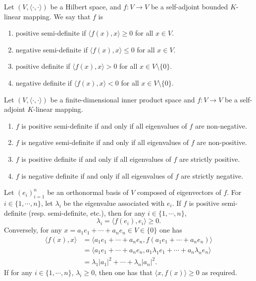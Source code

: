 \begin{definitionenv}
    Let $\left(V,\langle\cdot,\cdot\rangle\right)$ be a Hilbert space, and $f:V\rightarrow V$ be a self-adjoint bounded $K$-linear mapping.
    We say that $f$ is 
    \begin{enumerate}[label=\roman*]
        \item positive semi-definite if $\langle f(x),x\rangle \ge 0$ for all $x\in V$.
        \item negative semi-definite if $\langle f(x),x\rangle \le 0$ for all $x\in V$.
        \item positive definite if $\langle f(x),x\rangle > 0$ for all $x\in V\setminus \{0\}$.
        \item negative definite if $\langle f(x),x\rangle < 0$ for all $x\in V\setminus \{0\}$.
    \end{enumerate}
\end{definitionenv}

\begin{propositionenv}
    Let $(V,\langle\cdot,\cdot\rangle)$ be a finite-dimensional inner product space and $f:V\rightarrow V$ be a self-adjoint $K$-linear mapping.
    \begin{enumerate}
        \item $f$ is positive semi-definite if and only if all eigenvalues of $f$ are non-negative.
        \item $f$ is negative semi-definite if and only if all eigenvalues of $f$ are non-positive.
        \item $f$ is positive definite if and only if all eigenvalues of $f$ are strictly positive.
        \item $f$ is negative definite if and only if all eigenvalues of $f$ are strictly negative.
    \end{enumerate}
\end{propositionenv}
\begin{proofenv}
    Let $(e_i)_{i=1}^{n}$ be an orthonormal basis of $V$ composed of eigenvectors of $f$.
    For $i\in \{1,\cdots,n\}$, let $\lambda_i$ be the eigenvalue associated with $e_i$.
    If $f$ is positive semi-definite (resp. semi-definite, etc.), then for any $i\in \{1,\cdots,n\}$,
    $$ \lambda_i = \langle f(e_i), e_i\rangle \ge 0.$$
    Conversely, for any $x = a_1e_1 + \cdots + a_n e_n \in V\in \{0\}$ one has
    $$\begin{aligned}
        \langle f(x),x\rangle &= \langle a_1 e_1 + \cdots + a_n e_n, f(a_1 e_1 + \cdots + a_n e_n)\rangle\\
        &= \langle a_1 e_1 + \cdots + a_n e_n, a_1 \lambda_1 e_1 + \cdots + a_n \lambda_n e_n\rangle\\
        &= \lambda_1 |a_1|^2 + \cdots + \lambda_n |a_n|^2.
    \end{aligned}$$
    If for any $i \in \{1,\cdots,n\}$, $\lambda_i\ge 0$, then one has that $\langle x, f(x) \rangle\ge 0$ as required.
\end{proofenv}


